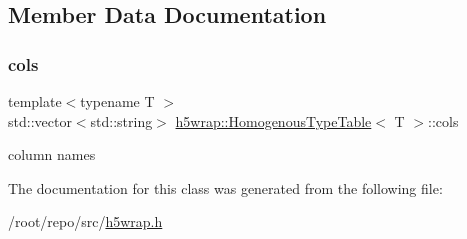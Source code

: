 \subsection{Member Data Documentation}
\mbox{\label{classh5wrap_1_1_homogenous_type_table_a8b60fa54475f44bea26caab0137d8507}} 
\subsubsection{\texorpdfstring{cols}{cols}}
{\footnotesize\ttfamily template$<$typename T $>$ \\
std\+::vector$<$std\+::string$>$ \hyperlink{classh5wrap_1_1_homogenous_type_table}{h5wrap\+::\+Homogenous\+Type\+Table}$<$ T $>$\+::cols}

column names 

The documentation for this class was generated from the following file\+:\begin{DoxyCompactItemize}
\item 
/root/repo/src/\hyperlink{h5wrap_8h}{h5wrap.\+h}\end{DoxyCompactItemize}
